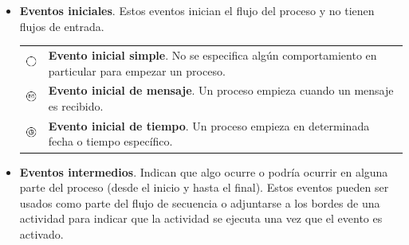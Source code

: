 \begin{itemize}
	\item {\bf Eventos iniciales}. Estos eventos inician el flujo del proceso y no tienen flujos de entrada.

	\begin{tabular}{| m{} m{} | }%
		\rowcolor[gray]{0.97}%
		\centering\noindent\includegraphics[width=18pt]{images/procesos/bpmn/StartEvent.png} & {\bf Evento inicial simple}. No se especifica algún comportamiento en particular para empezar un proceso. \\
		\centering\noindent\includegraphics[width=18pt]{images/procesos/bpmn/MessageEventStart.png} & {\bf Evento inicial de mensaje}. Un proceso empieza cuando un mensaje es recibido. \\
		\rowcolor[gray]{0.97}%
		\centering\noindent\includegraphics[width=18pt]{images/procesos/bpmn/TimerEventStart.png} & {\bf Evento inicial de tiempo}. Un proceso empieza en determinada fecha o tiempo específico.
	\end{tabular}%

	\item {\bf Eventos intermedios}. Indican que algo ocurre o podría ocurrir en alguna parte del proceso (desde el inicio y hasta el final). Estos eventos pueden ser usados como parte del flujo de secuencia o adjuntarse a los bordes de una actividad para indicar que la actividad se ejecuta una vez que el evento es activado.


\end{itemize}
